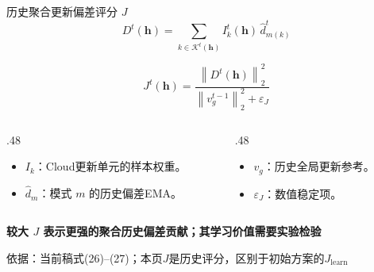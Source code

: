 \documentclass[aspectratio=169,11pt]{beamer}
\newcommand{\src}[1]{\vfill{\color{Gray}\fontsize{7.5}{9}\selectfont 依据：#1\par}}
\newcommand{\msg}[1]{\par\vspace{.14cm}{\color{Teal}\rule{.32cm}{1.5pt}}\hspace{.18cm}\textbf{#1}\par}
\newcommand{\tight}{\setlength{\itemsep}{.18cm}}
\begin{document}
\begin{frame}{历史聚合更新偏差评分 $J$}
\[
D^t(\mathbf h)=
\sum_{k\in\mathcal K^t(\mathbf h)}
I_k^t(\mathbf h)\,\widehat d_{m(k)}^t
\]
\par\vspace{-.15cm}
\[
\boxed{\quad
J^t(\mathbf h)=
\frac{\left\|D^t(\mathbf h)\right\|_2^2}
{\left\|v_g^{t-1}\right\|_2^2+\varepsilon_J}
\quad}
\]
\begin{columns}[T,onlytextwidth]
\begin{column}{.48\textwidth}
\begin{itemize}\tight
\item $I_k$：Cloud更新单元的样本权重。
\item $\widehat d_m$：模式 $m$ 的历史偏差EMA。
\end{itemize}
\end{column}
\begin{column}{.48\textwidth}
\begin{itemize}\tight
\item $v_g$：历史全局更新参考。
\item $\varepsilon_J$：数值稳定项。
\end{itemize}
\end{column}
\end{columns}
\msg{较大 $J$ 表示更强的聚合历史偏差贡献；其学习价值需要实验检验}
\src{当前稿式(26)--(27)；本页$J$是历史评分，区别于初始方案的$J_{\mathrm{learn}}$}
\end{frame}
\end{document}
